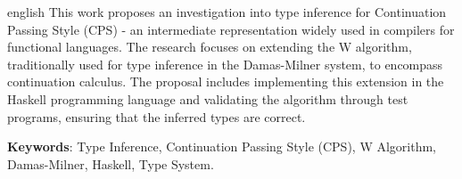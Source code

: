 
\begin{resumo}[Abstract]
  \begin{otherlanguage*}{english}
    This work proposes an investigation into type inference for Continuation Passing Style (CPS) - an intermediate representation widely used in compilers for functional languages.
    The research focuses on extending the W algorithm, traditionally used for type inference in the Damas-Milner system, to encompass continuation calculus.
    The proposal includes implementing this extension in the Haskell programming language and validating the algorithm through test programs, ensuring that the inferred types are correct.

    \textbf{Keywords}: Type Inference, Continuation Passing Style (CPS), W Algorithm, Damas-Milner, Haskell, Type System.
  \end{otherlanguage*}
\end{resumo}

